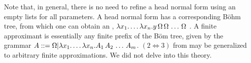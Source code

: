 Note that, in general, there is no need to refine a head normal form using an empty lists for
all parameters.
A head normal form has a corresponding B\"ohm tree, from which one
can obtain an ,
$\lambda x_1. \hdots\lambda x_n. y\,\Omega\,\Omega\,\hdots\,\Omega$
\cite{Barendregt:1984,dezani-ciancaglini-bohm-approximant}.
A finite approximant is essentially any finite prefix of the B\"om tree, given by the grammar
$A ::= \Omega |\lambda x_1. \hdots\lambda x_n. A_1\,A_2\,\hdots\,A_m$.
$(2 \iff 3)$ from  may be generalized to arbitrary
finite approximations. We did not delve into this theory.



